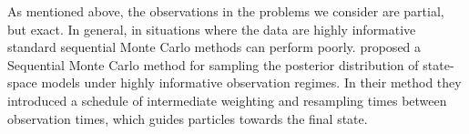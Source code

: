 As mentioned above, the observations in the problems we consider are partial, but exact. In general, in situations where the data are highly informative standard sequential Monte Carlo methods can perform poorly. %
\cite{Del Moral} proposed a Sequential Monte Carlo method for sampling the posterior distribution of state-space models under highly informative observation regimes. In their method they introduced a schedule of intermediate weighting and resampling times between observation times, which guides particles towards the final state.

